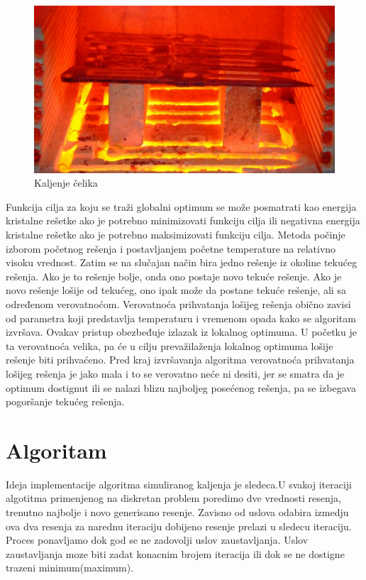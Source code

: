 \documentclass[a4paper]{article}
\begin{document}
\begin{figure}[h!]
\centering
\includegraphics[scale=0.3]{kal.jpg}
\caption{Kaljenje čelika}
\label{fig:universe}
\end{figure}

Funkcija cilja za koju se traži globalni optimum se može posmatrati kao energija kristalne rešetke ako je potrebno minimizovati funkciju cilja ili negativna energija kristalne rešetke ako
je potrebno maksimizovati funkciju cilja. Metoda počinje izborom početnog rešenja i postavljanjem početne temperature na relativno visoku vrednost. Zatim se na slučajan način bira
jedno rešenje iz okoline tekućeg rešenja. Ako je to rešenje bolje, onda ono postaje novo tekuće rešenje. Ako je novo rešenje lošije od tekućeg, ono ipak može da postane tekuće rešenje, ali
sa određenom verovatnoćom. Verovatnoća prihvatanja lošijeg rešenja obično zavisi od parametra koji predstavlja temperaturu i vremenom opada kako se algoritam izvršava. Ovakav pristup obezbeđuje izlazak iz lokalnog optimuma. U početku je ta verovatnoća velika, pa će
u cilju prevažilaženja lokalnog optimuma lošije rešenje biti prihvaćeno. Pred kraj izvršavanja
algoritma verovatnoća prihvatanja lošijeg rešenja je jako mala i to se verovatno neće ni desiti,
jer se smatra da je optimum dostignut ili se nalazi blizu najboljeg posećenog rešenja, pa se
izbegava pogoršanje tekućeg rešenja.


\section{Algoritam}
Ideja implementacije algoritma simuliranog kaljenja je sledeca.U svakoj iteraciji algotitma primenjenog na diskretan problem poredimo dve vrednosti resenja, trenutno najbolje i novo generisano resenje. Zavisno od uslova odabira izmedju ova dva resenja za narednu iteraciju dobijeno resenje prelazi u sledecu iteraciju. Proces ponavljamo  dok god se ne zadovolji uslov zaustavljanja. Uslov zaustavljanja moze biti zadat konacnim brojem iteracija ili dok se ne dostigne trazeni minimum(maximum).
\end{document}
